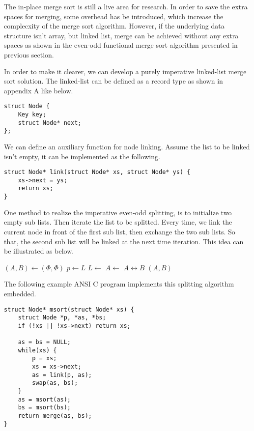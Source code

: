 \documentclass{article}
\begin{document}
The in-place merge sort is still a live area for research. In order to save the extra spaces for merging,
some overhead has be introduced, which increase the complecxity of the merge sort algorithm. However, if
the underlying data structure isn't array, but linked list, merge can be achieved without any extra spaces
as shown in the even-odd functional merge sort algorithm presented in previous section.

In order to make it clearer, we can develop a purely imperative linked-list merge sort solution.
The linked-list can be defined as a record type as shown in appendix A like below.

\lstset{language=C}
\begin{lstlisting}
struct Node {
    Key key;
    struct Node* next;
};  
\end{lstlisting}

We can define an auxiliary function for node linking. Assume the list to be linked isn't empty, it
can be implemented as the following.

\lstset{language=C}
\begin{lstlisting}
struct Node* link(struct Node* xs, struct Node* ys) {
    xs->next = ys;
    return xs;
}  
\end{lstlisting}

One method to realize the imperative even-odd splitting, is to initialize two empty sub lists.
Then iterate the list to be splitted. Every time, we link the current node in front of the
first sub list, then exchange the two sub lists. So that, the second sub list will be linked
at the next time iteration. This idea can be illustrated as below.

\begin{algorithmic}
  \State $(A, B) \gets (\Phi, \Phi)$
    \State $p \gets L$
    \State $L \gets $ 
    \State $A \gets $ 
    \State {} $A \leftrightarrow B$
  \EndWhile
  \State \Return $(A, B)$
\EndFunction
\end{algorithmic}

The following example ANSI C program implements this splitting algorithm embedded.

\lstset{language=C}
\begin{lstlisting}
struct Node* msort(struct Node* xs) {
    struct Node *p, *as, *bs;
    if (!xs || !xs->next) return xs;

    as = bs = NULL;
    while(xs) {
        p = xs;
        xs = xs->next;
        as = link(p, as);
        swap(as, bs);
    }
    as = msort(as);
    bs = msort(bs);
    return merge(as, bs);
}  
\end{lstlisting}
\end{document}
